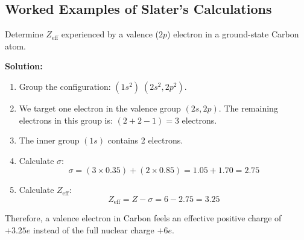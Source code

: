 \documentclass[12pt,a4paper]{article}
\begin{document}
\subsection{Worked Examples of Slater's Calculations}

\begin{tcolorbox}[examplebox, title={Example 1.1: Calculation for Carbon ($C$, $Z=6$)}]
  Determine $Z_{\text{eff}}$ experienced by a valence ($2p$) electron in a ground-state Carbon atom.
  \par\vspace{4pt}
  \textbf{Solution:}
  \begin{enumerate}
    \item Group the configuration: $(1s^2) \; (2s^2, 2p^2)$.
    \item We target one electron in the valence group $(2s, 2p)$. The remaining electrons in this group is: $(2 + 2 - 1) = 3$ electrons.
    \item The inner group $(1s)$ contains 2 electrons.
    \item Calculate $\sigma$:
      \[ \sigma = (3 \times 0.35) + (2 \times 0.85) = 1.05 + 1.70 = 2.75 \]
    \item Calculate $Z_{\text{eff}}$:
      \[ Z_{\text{eff}} = Z - \sigma = 6 - 2.75 = 3.25 \]
  \end{enumerate}
  Therefore, a valence electron in Carbon feels an effective positive charge of $+3.25e$ instead of the full nuclear charge $+6e$.
\end{tcolorbox}
\end{document}

